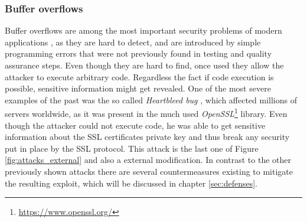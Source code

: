 \subsubsection{Buffer overflows}
Buffer overflows are among the most important security problems of modern applications \cite{pethia}, as they are hard to detect, and are introduced by simple programming errors that were not previously found in testing and quality assurance steps. Even though they are hard to find, once used they allow the attacker to execute arbitrary code. Regardless the fact if code execution is possible, sensitive information might get revealed. One of the most severe examples of the past was the so called \emph{Heartbleed bug} \cite{durumeri}, which affected millions of servers worldwide, as it was present in the much used \emph{OpenSSL}\footnote{\url{https://www.openssl.org/}} library. Even though the attacker could not execute code, he was able to get sensitive information about the SSL certificates private key and thus break any security put in place by the SSL protocol. This attack is the last one of Figure \ref{fig:attacks_external} and also a external modification. In contrast to the other previously shown attacks there are several countermeasures existing to mitigate the resulting exploit, which will be discussed in chapter \ref{sec:defenses}.